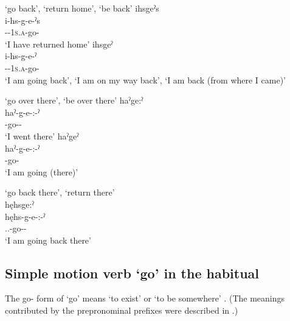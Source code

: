 \ea\label{ex:ppe7}  ‘go back’, ‘return home’, ‘be back’
\ea ihsgeˀs\\
\gll i-hs-g-e-ˀs\\
 {\prothetic}-{\repetitive}-\textsc{1s.a}-go-{\habitual}\\
\glt `I have returned home'
\ex ihsgeˀ \\
\gll i-hs-g-e-ˀ\\
 {\prothetic}-{\repetitive}-\textsc{1s.a}-go-{\stative}\\
\glt ‘I am going back’, ‘I am on my way back’, `I am back (from where I came)'
\z
\z

\ea\label{ex:ppe8}  ‘go over there’, ‘be over there’
\ea haˀge:ˀ\\
\gll haˀ-g-e-:-ˀ\\
 {\translocativefactual}-go-{\purposive}-{\punctual}\\
\glt `I went there'
\ex haˀgeˀ\\
\gll haˀ-g-e-:-ˀ\\
 {\translocativefactual}-go-{\punctual}\\
\glt `I am going (there)'
\z
\z

\ea\label{ex:ppe9}  ‘go back there’, ‘return there’\\
hęhsge:ˀ\\
\gll hęhs-g-e-:-ˀ\\
 {\translocative.\future.\repetitive}-go-{\purposive}-{\punctual}\\
\glt `I am going back there'
\z


\subsection{Simple motion verb  ‘go’ in the habitual} \label{ch:Simple motion verb in the habitual}
The  go-{\habitual}  form of  ‘go’ means ‘to exist’ or ‘to be somewhere’ . (The meanings contributed by the prepronominal prefixes were described in .)

